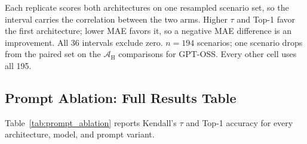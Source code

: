 \documentclass[11pt]{article}
\begin{document}
Each replicate scores both architectures on one resampled scenario set, so the interval carries the correlation between the two arms. Higher $\tau$ and Top-1 favor the first architecture; lower MAE favors it, so a negative MAE difference is an improvement. All 36 intervals exclude zero. $n = 194$ scenarios; one scenario drops from the paired set on the $\mathcal{A}_{\text{H}}$ comparisons for GPT-OSS. Every other cell uses all 195.

\subsection{Prompt Ablation: Full Results Table}
\label{app:prompt-ablation-full}

Table~\ref{tab:prompt_ablation} reports Kendall's $\tau$ and Top-1 accuracy for every architecture, model, and prompt variant.
\end{document}

